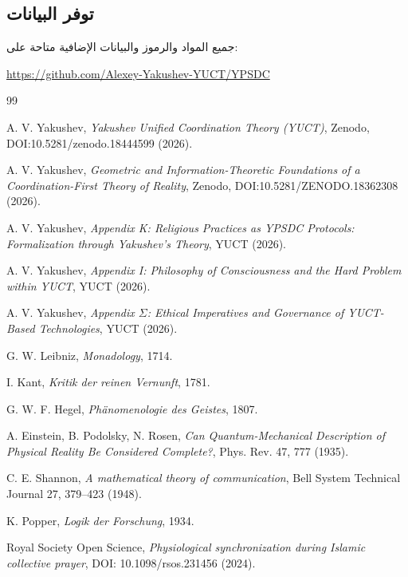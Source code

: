 \documentclass[11pt,a4paper]{article}
\begin{document}
	\subsection*{توفر البيانات}
	
	جميع المواد والرموز والبيانات الإضافية متاحة على:
	\begin{center}
		\url{https://github.com/Alexey-Yakushev-YUCT/YPSDC}
	\end{center}
	
	\begin{thebibliography}{99}
		
		A. V. Yakushev, \emph{Yakushev Unified Coordination Theory (YUCT)}, Zenodo, DOI:10.5281/zenodo.18444599 (2026).
		
		A. V. Yakushev, \emph{Geometric and Information-Theoretic Foundations of a Coordination-First Theory of Reality}, Zenodo, DOI:10.5281/ZENODO.18362308 (2026).
		
		A. V. Yakushev, \emph{Appendix K: Religious Practices as YPSDC Protocols: Formalization through Yakushev's Theory}, YUCT (2026).
		
		A. V. Yakushev, \emph{Appendix I: Philosophy of Consciousness and the Hard Problem within YUCT}, YUCT (2026).
		
		A. V. Yakushev, \emph{Appendix \(\Sigma\): Ethical Imperatives and Governance of YUCT-Based Technologies}, YUCT (2026).
		
		G. W. Leibniz, \emph{Monadology}, 1714.
		
		I. Kant, \emph{Kritik der reinen Vernunft}, 1781.
		
		G. W. F. Hegel, \emph{Phänomenologie des Geistes}, 1807.
		
		A. Einstein, B. Podolsky, N. Rosen, \emph{Can Quantum-Mechanical Description of Physical Reality Be Considered Complete?}, Phys. Rev. 47, 777 (1935).
		
		C. E. Shannon, \emph{A mathematical theory of communication}, Bell System Technical Journal 27, 379--423 (1948).
		
		K. Popper, \emph{Logik der Forschung}, 1934.
		
		Royal Society Open Science, \emph{Physiological synchronization during Islamic collective prayer}, DOI: 10.1098/rsos.231456 (2024).
		

\end{thebibliography}
\end{document}
